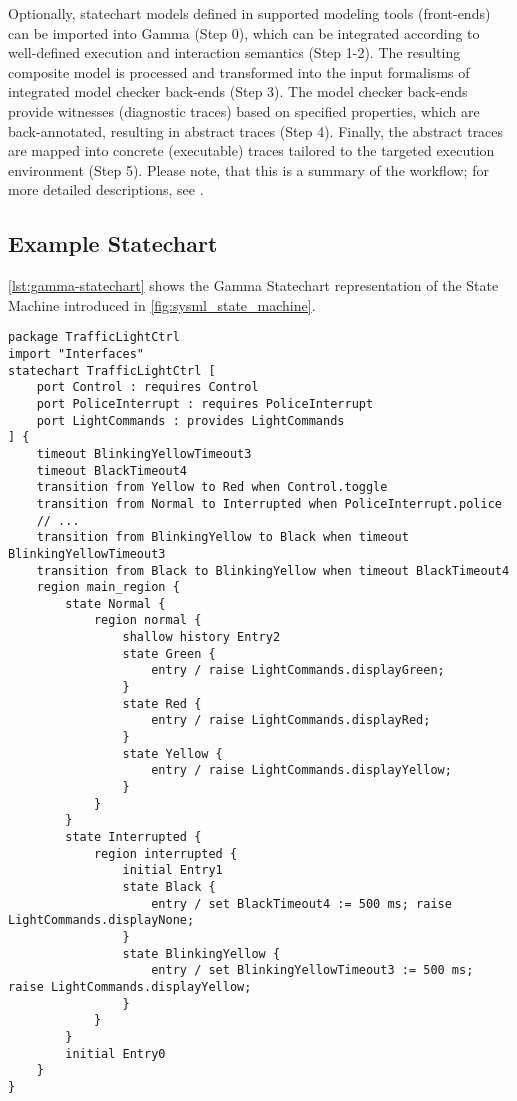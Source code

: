 Optionally, statechart models defined in supported modeling tools (front-ends) can be imported into Gamma (Step 0), which can be integrated according to well-defined execution and interaction semantics (Step 1-2). The resulting composite model is processed and transformed into the input formalisms of integrated model checker back-ends (Step 3). The model checker back-ends provide witnesses (diagnostic traces) based on specified properties, which are back-annotated, resulting in abstract traces (Step 4).
Finally, the abstract traces are mapped into concrete (executable) traces tailored to the targeted execution environment (Step 5). Please note, that this is a summary of the workflow; for more detailed descriptions, see \cite{mixed_statecharts_2020}.

\subsection{Example Statechart}

\autoref{lst:gamma-statechart} shows the Gamma Statechart representation of the State Machine introduced in \autoref{fig:sysml_state_machine}. 

\begin{lstlisting}[float,language=statechart, caption={The traffic light controller state machine in the Gamma textual representation.}, label={lst:gamma-statechart}]
package TrafficLightCtrl
import "Interfaces"
statechart TrafficLightCtrl [
	port Control : requires Control
	port PoliceInterrupt : requires PoliceInterrupt
	port LightCommands : provides LightCommands
] {
	timeout BlinkingYellowTimeout3
	timeout BlackTimeout4
	transition from Yellow to Red when Control.toggle
	transition from Normal to Interrupted when PoliceInterrupt.police
	// ...
	transition from BlinkingYellow to Black when timeout BlinkingYellowTimeout3
	transition from Black to BlinkingYellow when timeout BlackTimeout4
	region main_region {
		state Normal {
			region normal {
				shallow history Entry2
				state Green {
					entry / raise LightCommands.displayGreen;
				}
				state Red {
					entry / raise LightCommands.displayRed;
				}
				state Yellow {
					entry / raise LightCommands.displayYellow;
				}
			}
		}
		state Interrupted {
			region interrupted {
				initial Entry1
				state Black {
					entry / set BlackTimeout4 := 500 ms; raise LightCommands.displayNone;
				}
				state BlinkingYellow {
					entry / set BlinkingYellowTimeout3 := 500 ms; raise LightCommands.displayYellow;
				}
			}
		}
		initial Entry0
	}
}
\end{lstlisting}